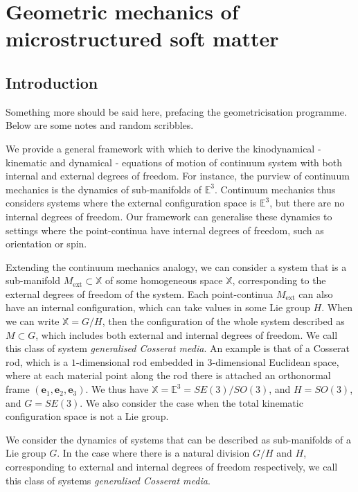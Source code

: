 
\part{Geometric mechanics of microstructured soft matter}



\chapter{Introduction}

{\color{red} Something more should be said here, prefacing the geometricisation programme. Below are some notes and random scribbles.}

We provide a general framework with which to derive the kinodynamical - kinematic and dynamical - equations of motion of continuum system with both internal and external degrees of freedom. For instance, the purview of continuum mechanics is the dynamics of sub-manifolds of $\mathbb{E}^3$. Continuum mechanics thus considers systems where the external configuration space is $\mathbb{E}^3$, but there are no internal degrees of freedom. Our framework can generalise these dynamics to settings where the point-continua have internal degrees of freedom, such as orientation or spin.

Extending the continuum mechanics analogy, we can consider a system that is a sub-manifold $M_\text{ext} \subset \mathbb{X}$ of some homogeneous space $\mathbb{X}$, corresponding to the external degrees of freedom of the system. Each point-continua $M_\text{ext} $ can also have an internal configuration, which can take values in some Lie group $H$. When we can write $\mathbb{X} = G / H$, then the configuration of the whole system described as $M \subset G$, which includes both external and internal degrees of freedom. We call this class of system \textit{generalised Cosserat media}. An example is that of a Cosserat rod, which is a $1$-dimensional rod embedded in $3$-dimensional Euclidean space, where at each material point along the rod there is attached an orthonormal frame $(\mathbf{e}_1, \mathbf{e}_2, \mathbf{e}_3)$. We thus have $\mathbb{X} = \mathbb{E}^3 = SE(3) / SO(3)$, and $H = SO(3)$, and $G = SE(3)$. We also consider the case when the total kinematic configuration space is not a Lie group.
  
We consider the dynamics of systems that can be described as sub-manifolds of a Lie group $G$. In the case where there is a natural division $G/H$ and $H$, corresponding to external and internal degrees of freedom respectively, we call this class of systems \textit{generalised Cosserat media}.

